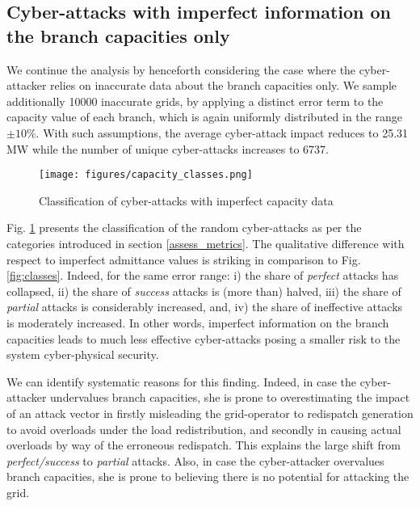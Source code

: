 \documentclass{IEEEtran4PSCC}
\begin{document}
\subsection{Cyber-attacks with imperfect information on the  {branch capacities only}}

We continue the analysis by henceforth considering the case  {where the cyber-attacker relies} on inaccurate data  {about} the branch capacities only. We sample additionally 10000 inaccurate grids, by applying a distinct error term to the capacity value of each branch, which is again uniformly distributed in the range $\pm10\%$.  With such assumptions, the average cyber-attack impact reduces to 25.31 MW while the number of unique cyber-attacks increases to 6737.
\begin{figure}[h]
\centering
\texttt{[image: figures/capacity\_classes.png]}
\caption{Classification of cyber-attacks with imperfect capacity data}
\label{fig:cap_classes}
\end{figure}

Fig. \ref{fig:cap_classes} presents the classification of the random cyber-attacks as per the categories introduced in section \ref{assess_metrics}. The qualitative difference with respect to imperfect admittance values is striking in comparison to Fig. \ref{fig:classes}. Indeed, for the same error range: i) the share of \emph{perfect} attacks has collapsed, ii) the share of \emph{success} attacks is  {(more than)} halved, iii) the share of \emph{partial} attacks is considerably increased, and, iv) the share of ineffective attacks is moderately increased.  In other words, imperfect information on the branch capacities leads to much less effective cyber-attacks posing a smaller risk to the system cyber-physical security.

We can identify systematic reasons for this finding. Indeed, in case the cyber-attacker undervalues branch capacities, she is prone to overestimating the impact of an attack vector in firstly misleading the grid-operator to redispatch generation to avoid overloads under the load redistribution, and secondly in causing actual overloads by way of the erroneous redispatch. This explains the large shift from \emph{perfect/success} to \emph{partial} attacks.  Also, in case the cyber-attacker overvalues branch capacities, she is prone to believing there is no potential for attacking the grid.
\end{document}
